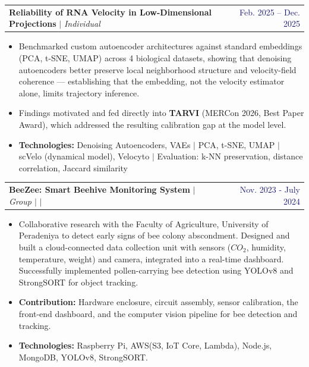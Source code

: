 \documentclass[a4paper,10pt]{article}
\makeatletter
\newcommand{\resumeItem}[1]{
  \item\small{
    {#1 \vspace{-2pt}}
  }
}
\newcommand{\resumeProjectHeading}[2]{
    \item
    \begin{tabular*}{0.97\textwidth}{l@{\extracolsep{\fill}}r}
      #1 & \footnotesize #2 \\
    \end{tabular*}\vspace{-7pt}
}
\newcommand{\resumeItemListStart}{\begin{itemize}}
\newcommand{\resumeItemListEnd}{\end{itemize}\vspace{-5pt}}
\makeatother
\begin{document}
        \vspace{4pt}
        \resumeProjectHeading
        {\textbf{Reliability of RNA Velocity in Low-Dimensional Projections} $|$ \emph{Individual}}{\textcolor{MidnightBlue}{Feb. 2025 -- Dec. 2025}}
        \resumeItemListStart
            \resumeItem{Benchmarked custom autoencoder architectures against standard embeddings (PCA, t-SNE, UMAP) across 4 biological datasets, showing that denoising autoencoders better preserve local neighborhood structure and velocity-field coherence --- establishing that the embedding, not the velocity estimator alone, limits trajectory inference.}
            \resumeItem{Findings motivated and fed directly into \textbf{TARVI} (MERCon 2026, Best Paper Award), which addressed the resulting calibration gap at the model level.}
            \resumeItem{\textbf{Technologies:} Denoising Autoencoders, VAEs $|$ PCA, t-SNE, UMAP $|$ scVelo (dynamical model), Velocyto $|$ Evaluation: k-NN preservation, distance correlation, Jaccard similarity}
        \resumeItemListEnd


        \vspace{4pt}
        \resumeProjectHeading
            {\textbf{BeeZee: Smart Beehive Monitoring System} $|$ \emph{Group $|$ \href{https://github.com/cepdnaclk/e19-3yp-beehive-monitoring-system}{\faIcon{github}} $|$ \href{https://cepdnaclk.github.io/e19-3yp-beehive-monitoring-system/}{\faIcon{globe}}}}{\textcolor{MidnightBlue}{Nov. 2023 - July 2024}}
        \resumeItemListStart
            \resumeItem{Collaborative research with the Faculty of Agriculture, University of Peradeniya to detect early signs of bee colony abscondment. Designed and built a cloud-connected data collection unit with sensors ($CO_2$, humidity, temperature, weight) and camera, integrated into a real-time dashboard. Successfully implemented pollen-carrying bee detection using YOLOv8 and StrongSORT for object tracking.}
            \resumeItem{\textbf{Contribution:} Hardware enclosure, circuit assembly, sensor calibration, the front-end dashboard, and the computer vision pipeline for bee detection and tracking.}
            \resumeItem{\textbf{Technologies:} Raspberry Pi, AWS(S3, IoT Core, Lambda), Node.js, MongoDB, YOLOv8, StrongSORT.}
          \resumeItemListEnd
\end{document}
